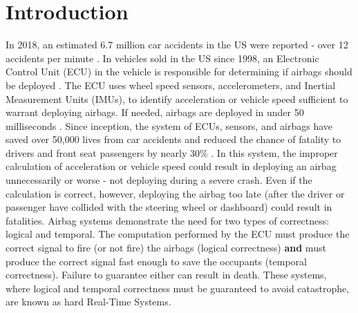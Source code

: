 \section{Introduction}   \label{chap:introduction}

In 2018, an estimated 6.7 million car accidents in the US were reported - over 12 accidents per minute \cite{national_highway_traffic_safety_administration_traffic_nodate}.
In vehicles sold in the US since 1998, an Electronic Control Unit (ECU) in the vehicle is responsible for determining if airbags should be deployed \cite{insurance_institute_for_highway_safety_airbags_nodate}.
The ECU uses wheel speed sensors, accelerometers, and Inertial Measurement Units (IMUs), to identify acceleration or vehicle speed sufficient to warrant deploying airbags. 
If needed, airbags are deployed in under 50 milliseconds \cite{national_highway_traffic_safety_administration_air_2016}.
Since inception, the system of ECUs, sensors, and airbags have saved over 50,000 lives from car accidents and reduced the chance of fatality to drivers and front seat passengers by nearly 30\% \cite{insurance_institute_for_highway_safety_airbags_nodate}.
In this system, the improper calculation of acceleration or vehicle speed could result in deploying an airbag unnecessarily or worse - not deploying during a severe crash.
Even if the calculation is correct, however, deploying the airbag too late (after the driver or passenger have collided with the steering wheel or dashboard) could result in fatalities.
Airbag systems demonstrate the need for two types of correctness: logical and temporal.
The computation performed by the ECU must produce the correct signal to fire (or not fire) the airbags (logical correctness) \textbf{and} must produce the correct signal fast enough to save the occupants (temporal correctness).
Failure to guarantee either can result in death.
These systems, where logical and temporal correctness must be guaranteed to avoid catastrophe, are known as hard Real-Time Systems.

